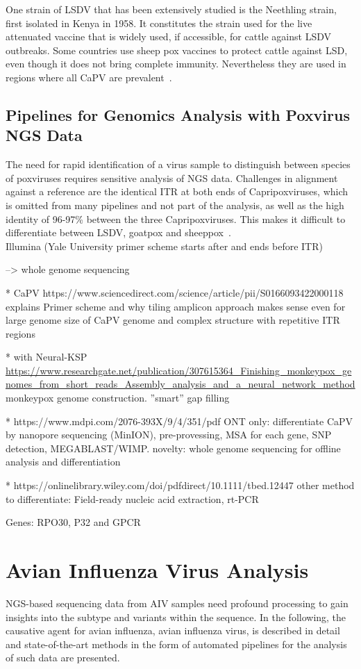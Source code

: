 One strain of LSDV that has been extensively studied is the Neethling strain, first isolated in Kenya in 1958. It constitutes the strain used for the live attenuated vaccine that is widely used, if accessible, for cattle against LSDV outbreaks. Some countries use sheep pox vaccines to protect cattle against LSD, even though it does not bring complete immunity. Nevertheless they are used in regions where all CaPV are prevalent~\cite{brenner2009appearance}.

\subsection{Pipelines for Genomics Analysis with Poxvirus NGS Data}
The need for rapid identification of a virus sample to distinguish between species of poxviruses requires sensitive analysis of NGS data. Challenges in alignment against a reference are the identical ITR at both ends of Capripoxviruses, which is omitted from many pipelines and not part of the analysis, as well as the high identity of 96-97\% between the three Capripoxviruses. This makes it difficult to differentiate between LSDV, goatpox and sheeppox~\cite{tulman2001genome}. \\
Illumina (Yale University primer scheme starts after and ends before ITR)

--> whole genome sequencing

* CaPV https://www.sciencedirect.com/science/article/pii/S0166093422000118 explains Primer scheme and why tiling amplicon approach makes sense even for large genome size of CaPV genome and complex structure with repetitive ITR regions

* with Neural-KSP \url{https://www.researchgate.net/publication/307615364_Finishing_monkeypox_genomes_from_short_reads_Assembly_analysis_and_a_neural_network_method}
monkeypox genome construction. ''smart'' gap filling

* https://www.mdpi.com/2076-393X/9/4/351/pdf ONT only: differentiate CaPV by nanopore sequencing (MinION), pre-provessing, MSA for each gene, SNP detection, MEGABLAST/WIMP. novelty: whole genome sequencing for offline analysis and differentiation

* https://onlinelibrary.wiley.com/doi/pdfdirect/10.1111/tbed.12447 other method to differentiate: Field-ready nucleic acid extraction, rt-PCR

Genes: RPO30, P32 and GPCR

\section{Avian Influenza Virus Analysis}\label{sec:AIV}
NGS-based sequencing data from AIV samples need profound processing to gain insights into the subtype and variants within the sequence. In the following, the causative agent for avian influenza, avian influenza virus, is described in detail and state-of-the-art methods in the form of automated pipelines for the analysis of such data are presented.

